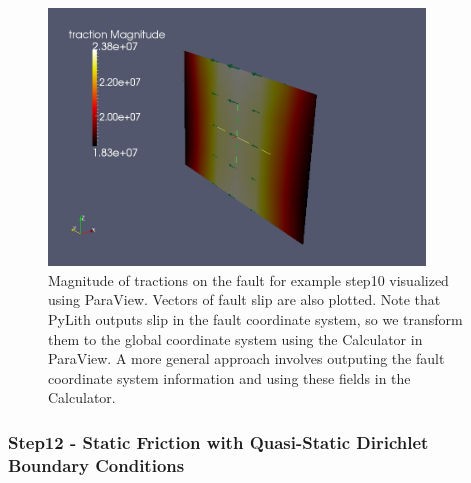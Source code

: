 \begin{figure}
  \includegraphics[width=10cm]{examples/figs/3dhex8_step11-fault-traction-slip}
  \caption{Magnitude of tractions on the fault for example step10
    visualized using ParaView. Vectors of fault slip are also
    plotted. Note that PyLith outputs slip in the fault coordinate
    system, so we transform them to the global coordinate system using
    the Calculator in ParaView.  A more general approach involves
    outputing the fault coordinate system information and using these
    fields in the Calculator.}
  \label{fig:example:3dhex8:step11:fault}
\end{figure}


\subsubsection{Step12 - Static Friction with Quasi-Static Dirichlet Boundary Conditions}

